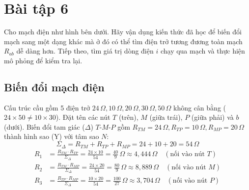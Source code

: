\section{Bài tập 6}

Cho mạch điện như hình bên dưới. Hãy vận dụng kiến thức đã học để biến đổi mạch sang một dạng khác mà ở đó có thể tìm điện trở tương đương toàn mạch $R_{ab}$ dễ dàng hơn. Tiếp theo, tìm giá trị dòng điện $i$ chạy qua mạch và thực hiện mô phỏng để kiểm tra lại.


\subsection{Biến đổi mạch điện}
\noindent Cấu trúc cầu gồm 5 điện trở $24\,\Omega, 10\,\Omega, 20\,\Omega, 30\,\Omega, 50\,\Omega$ không cân bằng ($24 \times 50 \neq 10 \times 30$). Đặt tên các nút $T$ (trên), $M$ (giữa trái), $P$ (giữa phải) và $b$ (dưới). Biến đổi tam giác ($\Delta$) $T$-$M$-$P$ gồm $R_{TM} = 24\,\Omega, R_{TP} = 10\,\Omega, R_{MP} = 20\,\Omega$ thành hình sao (Y) với tâm sao $N$:
\[
\Sigma_\Delta = R_{TM} + R_{TP} + R_{MP} = 24 + 10 + 20 = 54\,\Omega
\]
\begin{align*}
R_1 &= \frac{R_{TM} \cdot R_{TP}}{\Sigma_\Delta} = \frac{24 \times 10}{54} = \frac{40}{9}\,\Omega \approx 4{,}444\,\Omega \quad (\text{nối vào nút } T) \\
R_2 &= \frac{R_{TM} \cdot R_{MP}}{\Sigma_\Delta} = \frac{24 \times 20}{54} = \frac{80}{9}\,\Omega \approx 8{,}889\,\Omega \quad (\text{nối vào nút } M) \\
R_3 &= \frac{R_{TP} \cdot R_{MP}}{\Sigma_\Delta} = \frac{10 \times 20}{54} = \frac{100}{27}\,\Omega \approx 3{,}704\,\Omega \quad (\text{nối vào nút } P)
\end{align*}

